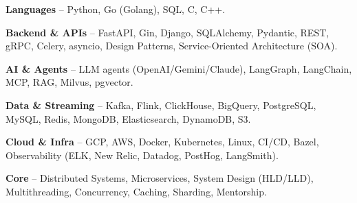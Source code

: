 \begin{zitemize}
\item \textbf{Languages} -- Python, Go (Golang), SQL, C, C++.
\item \textbf{Backend \& APIs} -- FastAPI, Gin, Django, SQLAlchemy, Pydantic, REST, gRPC, Celery, asyncio, Design Patterns, Service-Oriented Architecture (SOA).
\item \textbf{AI \& Agents} -- LLM agents (OpenAI/Gemini/Claude), LangGraph, LangChain, MCP, RAG, Milvus, pgvector.
\item \textbf{Data \& Streaming} -- Kafka, Flink, ClickHouse, BigQuery, PostgreSQL, MySQL, Redis, MongoDB, Elasticsearch, DynamoDB, S3.
\item \textbf{Cloud \& Infra} -- GCP, AWS, Docker, Kubernetes, Linux, CI/CD, Bazel, Observability (ELK, New Relic, Datadog, PostHog, LangSmith).
\item \textbf{Core} -- Distributed Systems, Microservices, System Design (HLD/LLD), Multithreading, Concurrency, Caching, Sharding, Mentorship.
\end{zitemize}
